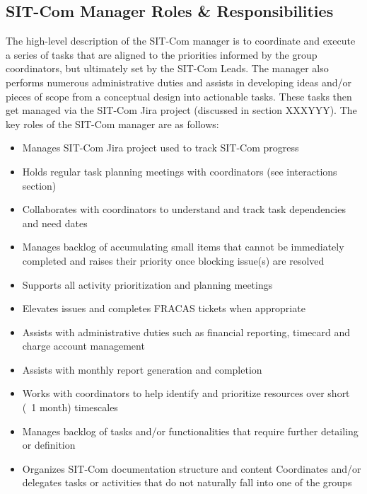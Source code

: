 \documentclass[SE,toc]{lsstdoc}
\begin{document}
\subsection{SIT-Com Manager Roles \& Responsibilities}
\label{sec:manager_r_and_rs}
The high-level description of the SIT-Com manager is to coordinate and execute a series of tasks that are aligned to the priorities informed by the group coordinators, but ultimately set by the SIT-Com Leads.
The manager also performs numerous administrative duties and assists in developing ideas and/or pieces of scope from a conceptual design into actionable tasks.
These tasks then get managed via the SIT-Com Jira project (discussed in section XXXYYY). The key roles of the SIT-Com manager are as follows:
\begin{itemize}
    \item Manages SIT-Com Jira project used to track SIT-Com progress
    \item Holds regular task planning meetings with coordinators (see interactions section)
    \item Collaborates with coordinators to understand and track task dependencies and need dates
    \item Manages backlog of accumulating small items that cannot be immediately completed and raises their priority once blocking issue(s) are resolved
    \item Supports all activity prioritization and planning meetings
    \item Elevates issues and completes FRACAS tickets when appropriate
    \item Assists with administrative duties such as financial reporting, timecard and charge account management
    \item Assists with monthly report generation and completion
    \item Works with coordinators to help identify and prioritize resources over short (~1 month) timescales
    \item Manages backlog of tasks and/or functionalities that require further detailing or definition
    \item Organizes SIT-Com documentation structure and content
Coordinates and/or delegates tasks or activities that do not naturally fall into one of the groups
\end{itemize}
\end{document}
